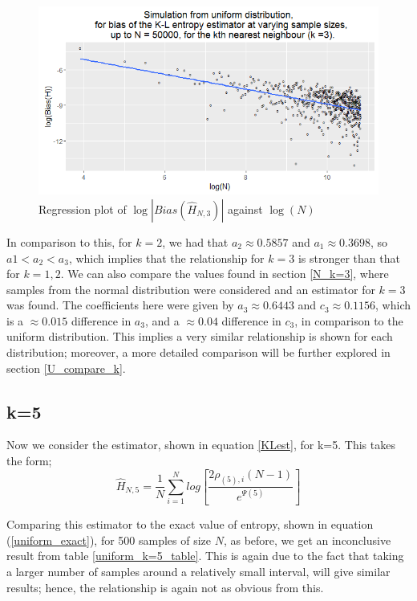 \documentclass{report}
\begin{document}
\begin{figure}
  \begin{center}
    \includegraphics[width=\textwidth]{./Graphs/Uniform_k=3_plot.png}
  \end{center}
\caption{Regression plot of $\log|Bias(\hat{H}_{N, 3})|$ against $\log(N)$}
  \label{uniform_k=3_graph}
\end{figure}

In comparison to this, for $k=2$, we had that $a_{2} \approx 0.5857$ and $a_{1} \approx 0.3698$, so $a{1} < a_{2} < a_{3}$, which implies that the relationship for $k=3$ is stronger than that for $k=1, 2$. We can also compare the values found in section \ref{N_k=3}, where samples from the normal distribution were considered and an estimator for $k=3$ was found. The coefficients here were given by $a_{3} \approx 0.6443$ and $c_{3} \approx 0.1156$, which is a $\approx 0.015$ difference in $a_{3}$, and a $\approx 0.04$ difference in $c_{3}$, in comparison to the uniform distribution. This implies a very similar relationship is shown for each distribution; moreover, a more detailed comparison will be further explored in section \ref{U_compare_k}.





\subsection{k=5} \label{U_k=5}
Now we consider the estimator, shown in equation \ref{KLest}, for k=5. This takes the form;
\begin{equation}
\hat{H}_{N, 5} = \frac{1}{N} \sum_{i=1}^{N} log \left[ \frac{2\rho_{(5),i}(N-1)}{e^{\Psi(5)}} \right] \nonumber
\end{equation}

Comparing this estimator to the exact value of entropy, shown in equation (\ref{uniform_exact}), for 500 samples of size $N$, as before, we get an inconclusive result from table \ref{uniform_k=5_table}. This is again due to the fact that taking a larger number of samples around a relatively small interval, will give similar results; hence, the relationship is again not as obvious from this. 
\end{document}
